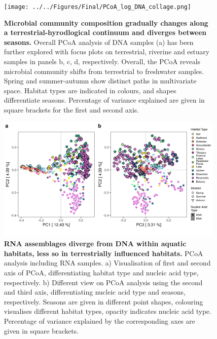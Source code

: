 \documentclass[12pt,a4paper]{article} %
\begin{document}
\begin{figure}[!ht]
\centering
\texttt{[image: ../../Figures/Final/PCoA\_log\_DNA\_collage.png]}
\caption{\textbf{Microbial community composition gradually changes along a terrestrial-hyrodlogical continuum and diverges between seasons.} Overall PCoA analysis of DNA samples (a) has been further explored with focus plots on terrestrial, riverine and estuary samples in panels b, c, d, respectively. Overall, the PCoA reveals microbial community shifts from terrestrial to freshwater samples. Spring and summer-autumn show distinct paths in multivariate space. Habitat types are indicated in colours, and shapes differentiate seasons. Percentage of variance explained are given in square brackets for the first and second axis.}
\end{figure}

\begin{figure}[!ht]
\centering
\includegraphics[width=17cm]{../../Figures/Final/PCoA_all_SampleType.png}
\caption{\textbf{RNA assemblages diverge from DNA within aquatic habitats, less so in terrestrially influenced habitats.} PCoA analysis including RNA samples. a) Visualisation of first and second axis of PCoA, differentiating habitat type and nucleic acid type, respectively. b) Different view on PCoA analysis using the second and third axis, differentiating nucleic acid type and seasons, respectively. Seasons are given in different point shapes, colouring visualises different habitat types, opacity indicates nucleic acid type. Percentage of variance explained by the corresponding axes are given in square brackets.}
\end{figure}
\end{document}

